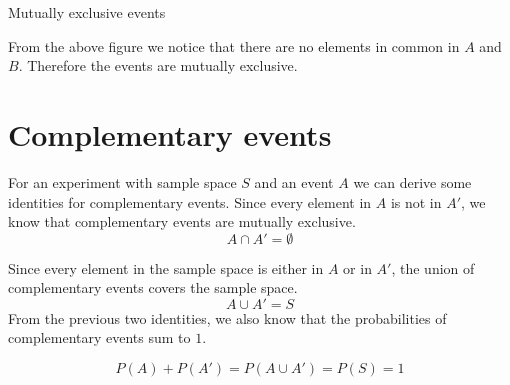 \begin{wex}{Mutually exclusive events}
{  

  From the above figure we notice that there are no elements in common in
  $A$ and $B$. Therefore the events are mutually exclusive.
}
\end{wex}
\section{Complementary events}


For an experiment with sample space $S$ and an event $A$ we can derive
some identities for complementary events. Since every element in $A$ is not in $A'$, we know
  that complementary events are mutually exclusive.
\begin{equation*}
 A \cap A' = \emptyset
\end{equation*}


Since every element in the sample space is either in $A$ or in
  $A'$, the union of complementary events covers the
  sample space.
\begin{equation*}
A \cup A' = S
\end{equation*}
From the previous two identities, we also know that the
  probabilities of complementary events sum to $1$.

\begin{equation*}
P(A) + P(A') = P(A \cup A') = P(S) = 1
\end{equation*}


